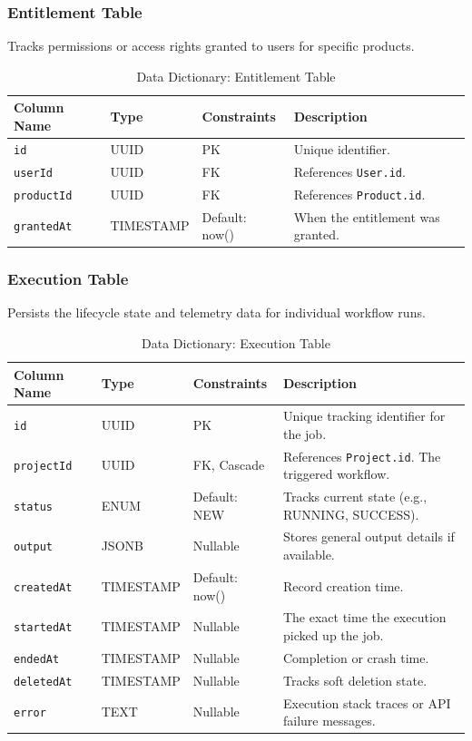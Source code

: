 \subsubsection{Entitlement Table}
Tracks permissions or access rights granted to users for specific products.
\begin{table}[H]
\centering
\renewcommand{\arraystretch}{1.3}
\begin{tabularx}{\textwidth}{|l|l|l|X|}
\hline
\textbf{Column Name} & \textbf{Type} & \textbf{Constraints} & \textbf{Description} \\
\hline
\texttt{id} & UUID & PK & Unique identifier. \\
\hline
\texttt{userId} & UUID & FK & References \texttt{User.id}. \\
\hline
\texttt{productId} & UUID & FK & References \texttt{Product.id}. \\
\hline
\texttt{grantedAt} & TIMESTAMP & Default: now() & When the entitlement was granted. \\
\hline
\end{tabularx}
\caption{Data Dictionary: Entitlement Table}
\label{tab:dict-entitlement}
\end{table}

\subsubsection{Execution Table}
Persists the lifecycle state and telemetry data for individual workflow runs.
\begin{table}[H]
\centering
\renewcommand{\arraystretch}{1.3}
\begin{tabularx}{\textwidth}{|l|l|l|X|}
\hline
\textbf{Column Name} & \textbf{Type} & \textbf{Constraints} & \textbf{Description} \\
\hline
\texttt{id} & UUID & PK & Unique tracking identifier for the job. \\
\hline
\texttt{projectId} & UUID & FK, Cascade & References \texttt{Project.id}. The triggered workflow. \\
\hline
\texttt{status} & ENUM & Default: NEW & Tracks current state (e.g., RUNNING, SUCCESS). \\
\hline
\texttt{output} & JSONB & Nullable & Stores general output details if available. \\
\hline
\texttt{createdAt} & TIMESTAMP & Default: now() & Record creation time. \\
\hline
\texttt{startedAt} & TIMESTAMP & Nullable & The exact time the execution picked up the job. \\
\hline
\texttt{endedAt} & TIMESTAMP & Nullable & Completion or crash time. \\
\hline
\texttt{deletedAt} & TIMESTAMP & Nullable & Tracks soft deletion state. \\
\hline
\texttt{error} & TEXT & Nullable & Execution stack traces or API failure messages. \\
\hline
\end{tabularx}
\caption{Data Dictionary: Execution Table}
\label{tab:dict-execution}
\end{table}

